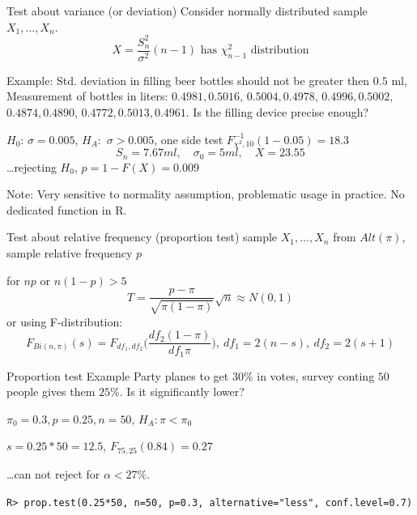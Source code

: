 \documentclass[smaller]{beamer}
\def\blue#1{{\usebeamercolor[fg]{my blue} #1}}
\def\xskip{{\vspace{2ex}}}
\begin{document}
\begin{frame}{Test about variance (or deviation)}
Consider normally distributed sample $X_1, \dots, X_n$.
\[
  X = \frac{S_n^2}{\sigma^2} (n-1) \text{ has $\chi_{n-1}^2$ distribution}
\]

\blue{Example: } Std. deviation in filling beer bottles should not be greater then $0.5$ ml,
Measurement of bottles in liters: $0.4981, 0.5016$, $0.5004, 0.4978$,
$0.4996,0.5002$, $0.4874, 0.4890$, $0.4772, 0.5013, 0.4961$. Is the filling device precise enough?

\xskip
$H_0$: $\sigma = 0.005$, $H_A:$ $\sigma > 0.005$, one side test
$F^{-1}_{\chi^2, 10}(1-0.05) = 18.3$
\[
 S_n = 7.67 ml,\quad \sigma_0 = 5 ml,\quad X=23.55
\]
\dots rejecting $H_0$, $p=1-F(X)=0.009$ 

\xskip
Note: Very sensitive to normality assumption, problematic usage in practice. No dedicated function in R.

\end{frame}



\begin{frame}[fragile]{Test about relative frequency (proportion test)}
sample $X_1,\dots, X_n$ from $Alt(\pi)$, sample relative frequency $p$

\xskip
for $np$ or $n(1-p) > 5$
\[
  T=\frac{p - \pi}{\sqrt{\pi(1-\pi)}}\sqrt{n} \approx N(0,1)
\]
or using F-distribution:
\[
  F_{Bi(n,\pi)}(s) = F_{df_1,df_2} \Big(\frac{df_2(1-\pi)}{df_1\pi}\Big),\ df_1=2(n-s),\ df_2=2(s+1)
\]
\end{frame}

\begin{frame}[fragile]{Proportion test Example}
Party planes to get $30\%$ in votes, survey conting $50$ people gives them $25\%$.
Is it significantly lower?

$\pi_0 = 0.3, p=0.25, n=50$, $H_A: \pi < \pi_0$

$s=0.25*50=12.5$, $F_{75,25}( 0.84 ) = 0.27$

\dots can not reject for $\alpha <27\%$.

\xskip
{\small
\verb'R> prop.test(0.25*50, n=50, p=0.3, alternative="less", conf.level=0.7)' 
}


\end{frame}
\end{document}
